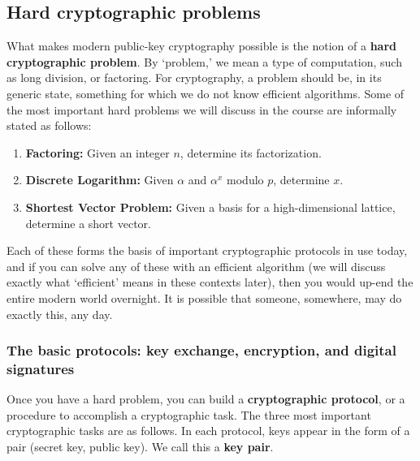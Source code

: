 \documentclass{article}
\theoremstyle{plain}
\theoremstyle{definition}
\theoremstyle{remark}
\numberwithin{theorem}{section}
\begin{document}
\subsection{Hard cryptographic problems}

What makes modern public-key cryptography possible is the notion of a \textbf{hard cryptographic problem}.  By `problem,' we mean a type of computation, such as long division, or factoring.  For cryptography, a problem should be, in its generic state, something for which we do not know efficient algorithms.  Some of the most important hard problems we will discuss in the course are informally stated as follows:

\begin{enumerate}
	\item \textbf{Factoring:}  Given an integer $n$, determine its factorization.
	\item \textbf{Discrete Logarithm:}  Given $\alpha$ and $\alpha^x$ modulo $p$, determine $x$.
	\item \textbf{Shortest Vector Problem:}  Given a basis for a high-dimensional lattice, determine a short vector.
\end{enumerate}

Each of these forms the basis of important cryptographic protocols in use today, and if you can solve any of these with an efficient algorithm (we will discuss exactly what `efficient' means in these contexts later), then you would up-end the entire modern world overnight.  It is possible that someone, somewhere, may do exactly this, any day.



\subsubsection{The basic protocols:  key exchange, encryption, and digital signatures}

Once you have a hard problem, you can build a \textbf{cryptographic protocol}, or a procedure to accomplish a cryptographic task.  The three most important cryptographic tasks are as follows.  In each protocol, keys appear in the form of a pair (secret key, public key).  We call this a \textbf{key pair}.
\end{document}
